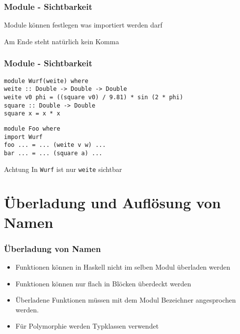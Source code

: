 \begin{frame}
\frametitle{Module - Sichtbarkeit}
\begin{block}{\vspace*{-3ex}}
Module können festlegen was importiert werden darf
\end{block}
\begin{block}{\vspace*{-3ex}}
\begin{center}
\scalebox{0.7}{}
\end{center}
Am Ende steht natürlich kein Komma
\end{block}
\end{frame}

\begin{frame}[fragile]
\frametitle{Module - Sichtbarkeit} 
\begin{lstlisting}
module Wurf(weite) where
weite :: Double -> Double -> Double
weite v0 phi = ((square v0) / 9.81) * sin (2 * phi)
square :: Double -> Double
square x = x * x
\end{lstlisting}
\begin{lstlisting}
module Foo where
import Wurf
foo ... = ... (weite v w) ...
bar ... = ... (square a) ...
\end{lstlisting}
\begin{alertblock}{Achtung}
In \lstinline|Wurf| ist nur \lstinline|weite| sichtbar
\end{alertblock}
\end{frame}

\section[Bezeichner]{Überladung und Auflösung von Namen}
\begin{frame}
\frametitle{Überladung von Namen}
\begin{block}{\vspace*{-3ex}}
\begin{itemize}
  \item Funktionen können in Haskell nicht im selben Modul überladen werden
  \item Funktionen können nur flach in Blöcken überdeckt werden
  \item Überladene Funktionen müssen mit dem Modul Bezeichner angesprochen werden.
  \item Für Polymorphie werden Typklassen verwendet
\end{itemize}
\end{block}
\end{frame}

